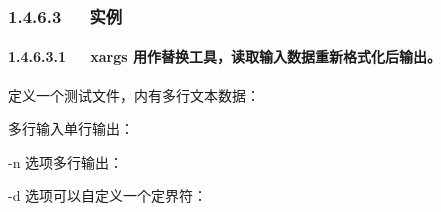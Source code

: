 \documentclass[letterpaper,12pt,english]{sphinxmanual}
\begin{document}
\subsubsection{1.4.6.3   实例}
\label{\detokenize{001software/001install/linux:id23}}

\paragraph{1.4.6.3.1   xargs 用作替换工具，读取输入数据重新格式化后输出。}
\label{\detokenize{001software/001install/linux:id24}}
定义一个测试文件，内有多行文本数据：

\begin{sphinxVerbatim}[commandchars=\\\{\}]

      
      
  
  
     
\end{sphinxVerbatim}

多行输入单行输出：

\begin{sphinxVerbatim}[commandchars=\\\{\}]
                         
\end{sphinxVerbatim}

-n 选项多行输出：

\begin{sphinxVerbatim}[commandchars=\\\{\}]

  
  
  
  
  
  
  
  
 
\end{sphinxVerbatim}

-d 选项可以自定义一个定界符：
\end{document}
